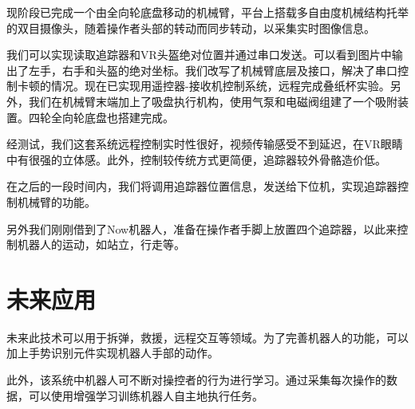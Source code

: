现阶段已完成一个由全向轮底盘移动的机械臂，平台上搭载多自由度机械结构托举的双目摄像头，随着操作者头部的转动而同步转动，以采集实时图像信息。

我们可以实现读取追踪器和VR头盔绝对位置并通过串口发送。可以看到图片中输出了左手，右手和头盔的绝对坐标。我们改写了机械臂底层及接口，解决了串口控制卡顿的情况。现在已实现用遥控器-接收机控制系统，远程完成叠纸杯实验。另外，我们在机械臂末端加上了吸盘执行机构，使用气泵和电磁阀组建了一个吸附装置。四轮全向轮底盘也搭建完成。

经测试，我们这套系统远程控制实时性很好，视频传输感受不到延迟，在VR眼睛中有很强的立体感。此外，控制较传统方式更简便，追踪器较外骨骼造价低。

在之后的一段时间内，我们将调用追踪器位置信息，发送给下位机，实现追踪器控制机械臂的功能。

另外我们刚刚借到了Now机器人，准备在操作者手脚上放置四个追踪器，以此来控制机器人的运动，如站立，行走等。


\section{}

\section{}



\chapter{未来应用}
未来此技术可以用于拆弹，救援，远程交互等领域。为了完善机器人的功能，可以加上手势识别元件实现机器人手部的动作。

此外，该系统中机器人可不断对操控者的行为进行学习。通过采集每次操作的数据，可以使用增强学习训练机器人自主地执行任务。
